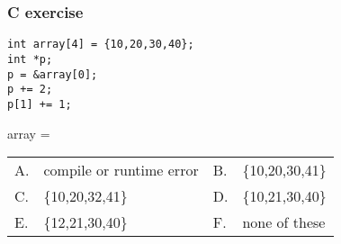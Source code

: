 \begin{frame}[fragile]\frametitle{C exercise}
\lstset{language=C,style=small}
\begin{lstlisting}
int array[4] = {10,20,30,40};
int *p;
p = &array[0];
p += 2;
p[1] += 1;
\end{lstlisting}
array = \\
\begin{tabular}{llll}
A. & compile or runtime error   & B. & \{10,20,30,41\} \\
C. & \{10,20,32,41\} & D. & \{10,21,30,40\} \\
E. & \{12,21,30,40\} & F. & none of these \\
\end{tabular}
\end{frame}
